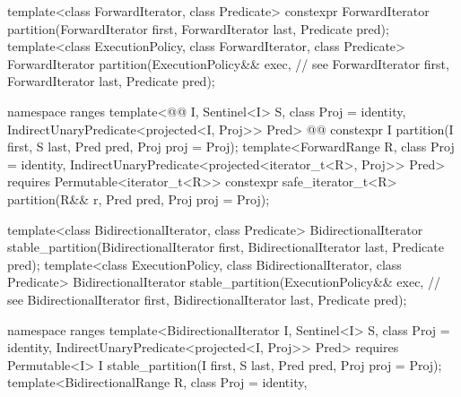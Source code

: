 \begin{codeblock}
  template<class ForwardIterator, class Predicate>
    constexpr ForwardIterator partition(ForwardIterator first,
                                        ForwardIterator last,
                                        Predicate pred);
  template<class ExecutionPolicy, class ForwardIterator, class Predicate>
    ForwardIterator partition(ExecutionPolicy&& exec, // see 
                              ForwardIterator first,
                              ForwardIterator last,
                              Predicate pred);
\end{codeblock}\begin{addedblock}\begin{codeblock}
  namespace ranges {
    template<@@ I, Sentinel<I> S, class Proj = identity,
        IndirectUnaryPredicate<projected<I, Proj>> Pred>
      @@
      constexpr I
        partition(I first, S last, Pred pred, Proj proj = Proj{});
    template<ForwardRange R, class Proj = identity,
        IndirectUnaryPredicate<projected<iterator_t<R>, Proj>> Pred>
      requires Permutable<iterator_t<R>>
      constexpr safe_iterator_t<R>
        partition(R&& r, Pred pred, Proj proj = Proj{});
  }
\end{codeblock}\end{addedblock}\begin{codeblock}
  template<class BidirectionalIterator, class Predicate>
    BidirectionalIterator stable_partition(BidirectionalIterator first,
                                           BidirectionalIterator last,
                                           Predicate pred);
  template<class ExecutionPolicy, class BidirectionalIterator, class Predicate>
    BidirectionalIterator stable_partition(ExecutionPolicy&& exec, // see 
                                           BidirectionalIterator first,
                                           BidirectionalIterator last,
                                           Predicate pred);
\end{codeblock}\begin{addedblock}\begin{codeblock}
  namespace ranges {
    template<BidirectionalIterator I, Sentinel<I> S, class Proj = identity,
        IndirectUnaryPredicate<projected<I, Proj>> Pred>
      requires Permutable<I>
      I stable_partition(I first, S last, Pred pred, Proj proj = Proj{});
    template<BidirectionalRange R, class Proj = identity,
}
\end{codeblock}
\end{addedblock}
